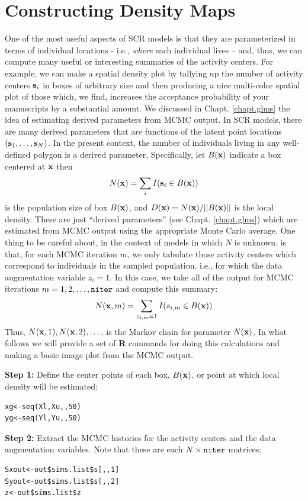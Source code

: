 \section{Constructing Density Maps}
\label{scr0.sec.mapping}

One of the most useful aspects of SCR models is that they are
parameterized in terms of individual locations - i.e., {\it where}
each individual lives -- and, thus, we can compute many useful or
interesting summaries of the activity centers.  For example, we can
make a spatial density plot by tallying up the number of activity
centers ${\bf s}_{i}$ in boxes of arbitrary size and then producing a
nice multi-color spatial plot of those which, we find, increases the
acceptance probability of your manuscripts by a substantial amount.
We discussed in Chapt. \ref{chapt.glms} the idea of estimating derived
parameters from MCMC output. In SCR models, there are many derived
parameters that are functions of the latent point locations $({\bf
  s}_{1},\ldots, {\bf s}_{N})$. In the present context, the number of
individuals living in any well-defined polygon is a derived
parameter. Specifically, let $B({\bf x})$ indicate a box centered at
${\bf x}$ then
\[
N({\bf x})=\sum_{i} I({\bf s}_{i} \in B({\bf x}))
\]
is the population size of box $B({\bf x})$, and $D({\bf x}) = N({\bf
  x})/||B({\bf x})||$ is the local density. These are just ``derived
parameters'' (see Chapt.  \ref{chapt.glms}) which are estimated from
MCMC output using the appropriate Monte Carlo average. One thing to be
careful about, in the context of models in which $N$ is unknown, is
that, for each MCMC iteration $m$, we only tabulate those activity
centers which correspond to individuals in the sampled
population. i.e., for which the data augmentation variable $z_{i} =
1$.  In this case, we take all of the output for MCMC iterations
$m=1,2,\ldots,\mbox{\tt niter}$ and compute this summary:
\[
   N({\bf x},m) = \sum_{z_{i,m}=1} I(s_{i,m} \in B({\bf x}))
\]
Thus, $N({\bf x},1),N({\bf x},2),\dots,$ is the Markov chain for
parameter $N({\bf x})$.  In what follows we will provide a set of {\bf
  R} commands for doing this calculations and making a basic image
plot from the MCMC output.

{\flushleft \bf Step 1:} Define the center points of each box, $B({\bf
  x})$, or point at which local density will be estimated:
\begin{verbatim}
xg<-seq(Xl,Xu,,50)
yg<-seq(Yl,Yu,,50)
\end{verbatim}

{\flushleft \bf Step 2:} Extract the MCMC histories for the activity
centers and the data augmentation variables.  Note that these are each
$N \times \mbox{\tt niter}$ matrices:
\begin{verbatim}
Sxout<-out$sims.list$s[,,1]
Syout<-out$sims.list$s[,,2]
z<-out$sims.list$z
\end{verbatim}

